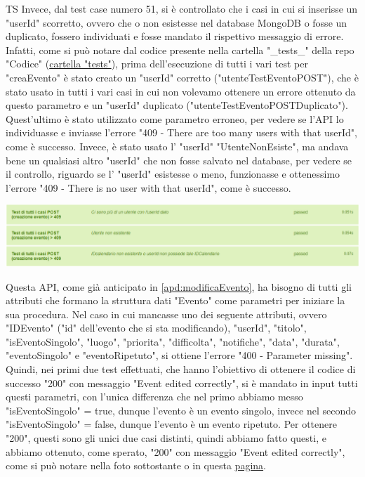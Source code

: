 \begin{listaPersonale}{TS}
                Invece, dal test case numero 51, si è controllato che i casi in cui si inserisse un "userId" scorretto, ovvero che o non esistesse nel database MongoDB o fosse un duplicato, fossero individuati e fosse mandato il rispettivo messaggio di errore. Infatti, come si può notare dal codice presente nella cartella "\_tests\_" della repo "Codice" (\href{https://github.com/Life-planner/Codice/tree/main/__tests__}{cartella "tests"}), prima dell'esecuzione di tutti i vari test per "creaEvento" è stato creato un "userId" corretto ("utenteTestEventoPOST"), che è stato usato in tutti i vari casi in cui non volevamo ottenere un errore ottenuto da questo parametro e un "userId" duplicato ("utenteTestEventoPOSTDuplicato"). Quest'ultimo è stato utilizzato come parametro erroneo, per vedere se l'API lo individuasse e inviasse l'errore "409 - There are too many users with that userId", come è successo. Invece, è stato usato l' "userId" "UtenteNonEsiste", ma andava bene un qualsiasi altro "userId" che non fosse salvato nel database, per vedere se il controllo, riguardo se l' "userId" esistesse o meno, funzionasse e ottenessimo l'errore "409 - There is no user with that userId", come è successo.
                \begin{center}
                        \includegraphics[width=1\textwidth, height=0.12\textheight]{img/png/tests/EventoPost/409_PostEvento.png}
                \end{center}
                Questa API, come già anticipato in \ref{apd:modificaEvento}, ha bisogno di tutti gli attributi che formano la struttura dati "Evento" come parametri per iniziare la sua procedura. Nel caso in cui mancasse uno dei seguente attributi, ovvero "IDEvento" ("id" dell'evento che si sta modificando), "userId", "titolo", "isEventoSingolo", "luogo", "priorita", "difficolta", "notifiche", "data", "durata", "eventoSingolo" e "eventoRipetuto", si ottiene l'errore "400 - Parameter missing". Quindi, nei primi due test effettuati, che hanno l'obiettivo di ottenere il codice di successo "200" con messaggio "Event edited correctly", si è mandato in input tutti questi parametri, con l'unica differenza che nel primo abbiamo messo "isEventoSingolo" = true, dunque l'evento è un evento singolo, invece nel secondo "isEventoSingolo" = false, dunque l'evento è un evento ripetuto. Per ottenere "200", questi sono gli unici due casi distinti, quindi abbiamo fatto questi, e abbiamo ottenuto, come sperato, "200" con messaggio "Event edited correctly", come si può notare nella foto sottostante o in questa  \href{https://plan-it.it/test-report.html} {pagina}.

\end{listaPersonale}
